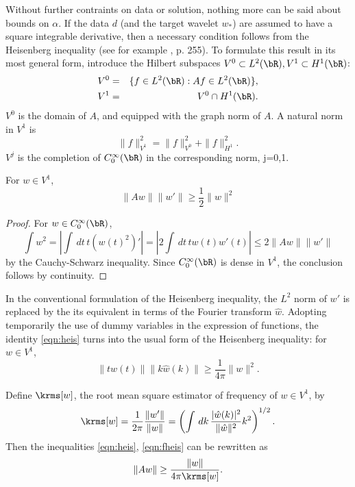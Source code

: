 Without further contraints on data or solution, nothing more can be
said about bounds on $\alpha$. If the data $d$ (and the target wavelet
$w_*$) are assumed to have a square integrable derivative, then a
necessary condition follows from the Heisenberg
inequality (see for example \cite{Folland:07}, p. 255). To formulate
this result in its most general form, introduce the Hilbert subspaces
$V^0 \subset L^2(\bR), V^1 \subset H^1(\bR)$:
\begin{eqnarray}
  V^0 & = & \{ f \in L^2(\bR): Af \in L^2(\bR)\}, \nonumber\\
  V^1 & = & V^0 \cap H^1(\bR).
            \label{eqn:vdef}
\end{eqnarray}
$V^0$ is the domain of $A$, and equipped with the graph norm of $A$. A
natural norm in $V^1$ is
\[
  \|f\|^2_{V^1} = \|f\|_{V^0}^2 + \|f\|_{H^1}^2.
\]
$V^j$ is the completion of $C_0^{\infty}(\bR)$ in the corresponding
norm, j=0,1.

\begin{proposition}
  \label{thm:heis}
For $w \in V^1$,
  \begin{equation}
    \label{eqn:heis}
    \|Aw\|\|w'\| \ge \frac{1}{2}\|w\|^2
  \end{equation}
\end{proposition}

\begin{proof}
  For $w \in C_0^{\infty}(\bR)$,
  \[
    \int w^2 = \left|\int\,dt\, t (w(t)^2)' \right|= \left|2\int\,dt\,tw(t)w'(t)\right| \le
    2\|Aw\| \|w'\|
  \]
  by the Cauchy-Schwarz inequality. Since $C_0^{\infty}(\bR)$ is dense
  in $V^1$, the conclusion follows by continuity.
\end{proof}

In the conventional formulation of the Heisenberg inequality, the $L^2$ norm of
$w'$ is replaced by the its equivalent in terms of the Fourier
transform $\hat{w}$. Adopting temporarily the use of dummy variables
in the expression of functions, the identity \ref{eqn:heis} turns into
the usual form of the Heisenberg inequality: for $w \in V^1$,
\begin{equation}
\label{eqn:fheis}
\|tw(t)\|\|k\hat{w}(k)\| \ge \frac{1}{4\pi}\|w\|^2.
\end{equation}

Define $\krms[w]$, the root mean square estimator of frequency of $w
\in V^1$, by
\begin{equation}
  \label{eqn:krms}
  \krms[w]=\frac{1}{2\pi}\frac{\|w'\|}{\|w\|} = \left(\int
    \,dk\,\frac{|\hat{w}(k)|^2}{\|\hat{w}\|^2} k^2\right)^{1/2}.
\end{equation}
Then the inequalities \ref{eqn:heis}, \ref{eqn:fheis} can be rewritten as
\begin{equation}
  \label{eqn:frmsheis}
  \|Aw\| \ge \frac{\|w\|}{4\pi \krms[w]}.
\end{equation}


